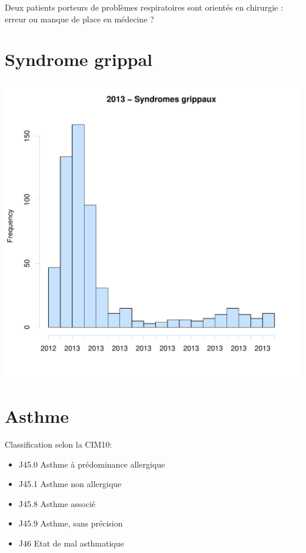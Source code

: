 \documentclass[12pt,english,french,twoside]{book}\usepackage[]{graphicx}\usepackage[]{color}
\makeatletter
\def\maxwidth{ %
  \ifdim\Gin@nat@width>\linewidth
    \linewidth
  \else
    \Gin@nat@width
  \fi
}
\newenvironment{knitrout}{}{} %
\makeatother
\begin{document}
Deux patients porteurs de problèmes respiratoires sont orientés en chirurgie : erreur ou manque de place en médecine ?

\section{Syndrome grippal}

\begin{knitrout}
\color{fgcolor}
\includegraphics[width=\maxwidth]{figure/grippe} 

\end{knitrout}


\section{Asthme}

Classification selon la CIM10:
\begin{itemize}
  \item J45.0 Asthme à prédominance allergique
  \item J45.1 Asthme non allergique
  \item J45.8 Asthme associé 
  \item J45.9 Asthme, sans précision
  \item J46   Etat de mal asthmatique
\end{itemize}
\end{document}
